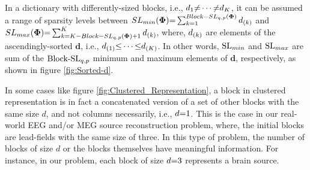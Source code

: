 In a dictionary with differently-sized blocks, i.e., $d_1 {\neq} \cdots {\neq} d_K$, it can be assumed a range of sparsity levels between $SL_{min}(\boldsymbol{\Phi}) {=} \sum_{k {=} 1}^{Block{-}SL_{q,p}(\boldsymbol{\Phi})} d_{\left( k \right)}$ and $SL_{max}(\boldsymbol{\Phi}) {=} \sum_{k {=} K {-} Block{-}SL_{q,p}(\boldsymbol{\Phi}) {+} 1}^{K}d_{(k)}$, where, $d_{\left( k \right)}$ are elements of the ascendingly-sorted $\boldsymbol{d}$, i.e., $d_{(1)} {\leq} \cdots {\leq} d_{(K)}$.
In other words, $\mathrm{SL}_{min}$ and $\mathrm{SL}_{max}$ are sum of the $\mathrm{Block\text{{-}}SL}_{q,p}$ minimum and maximum elements of $\boldsymbol{d}$, respectively, as shown in figure \ref{fig:Sorted-d}. 




In some cases like figure \ref{fig:Clustered_Representation}, a block in clustered representation is in fact a concatenated version of a set of other blocks with the same size $d$, and not columns necessarily, i.e., $d {=} 1$.
This is the case in our real-world EEG and/or MEG source reconstruction problem, where, the initial blocks are lead-fields with the same size of three. 
In this type of problem, the number of blocks of size $d$ or the blocks themselves have meaningful information.
For instance, in our problem, each block of size $d {=} 3$ represents a brain source.

